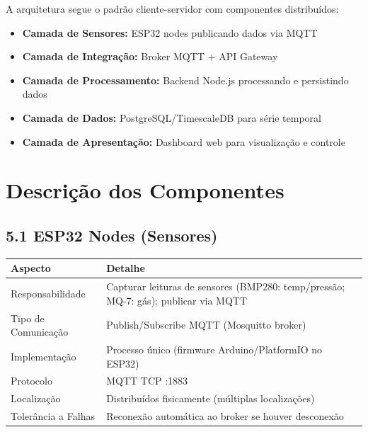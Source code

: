 \documentclass[12pt,a4paper,oneside]{report}
\begin{document}
A arquitetura segue o padrão cliente-servidor com componentes distribuídos:

\begin{itemize}
    \item \textbf{Camada de Sensores:} ESP32 nodes publicando dados via MQTT
    \item \textbf{Camada de Integração:} Broker MQTT + API Gateway
    \item \textbf{Camada de Processamento:} Backend Node.js processando e persistindo dados
    \item \textbf{Camada de Dados:} PostgreSQL/TimescaleDB para série temporal
    \item \textbf{Camada de Apresentação:} Dashboard web para visualização e controle
\end{itemize}

\chapter{Descrição dos Componentes}

\section{5.1 ESP32 Nodes (Sensores)}

\begin{center}
\begin{tabular}{|m{3cm}|m{10cm}|}
    \hline
    \rowcolor{lightblue}
    \textbf{Aspecto} & \textbf{Detalhe} \\
    \hline
    Responsabilidade & Capturar leituras de sensores (BMP280: temp/pressão; MQ-7: gás); publicar via MQTT \\
    \hline
    Tipo de Comunicação & Publish/Subscribe MQTT (Mosquitto broker) \\
    \hline
    Implementação & Processo único (firmware Arduino/PlatformIO no ESP32) \\
    \hline
    Protocolo & MQTT TCP :1883 \\
    \hline
    Localização & Distribuídos fisicamente (múltiplas localizações) \\
    \hline
    Tolerância a Falhas & Reconexão automática ao broker se houver desconexão \\
    \hline
\end{tabular}
\end{center}
\end{document}
